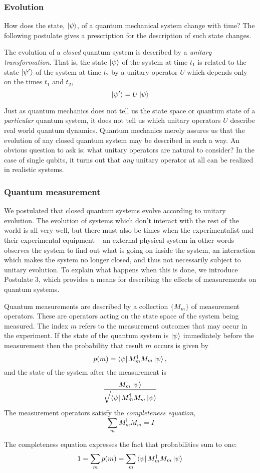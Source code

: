  \subsubsection{Evolution}
 How does the state, $\ket{\psi}$, of a quantum mechanical system change with time? The following postulate gives a prescription for the description of such state changes.
 \begin{postulate}
     The evolution of a \textit{closed} quantum system is described by a \textit{unitary transformation}. That is, the state $\ket{\psi}$ of the system at time $t_1$ is related to the state $\ket{\psi'}$ of the system at time $t_2$ by a unitary operator $U$ which depends only on the times $t_1$ and $t_2$,
        $$\ket{\psi'} = U\ket{\psi}$$
 \end{postulate}
 Just as quantum mechanics does not tell us the state space or quantum state of a \textit{particular} quantum system, it does not tell us which unitary operators $U$ describe real world quantum dynamics. Quantum mechanics merely assures us that the evolution of any closed quantum system may be described in such a way. An obvious question to ask is: what unitary operators are natural to consider? In the case of single qubits, it turns out that \textit{any} unitary operator at all can be realized in realistic systems.
 
 \subsubsection{Quantum measurement}
 We postulated that closed quantum systems evolve according to unitary evolution. The evolution of systems which don’t interact with the rest of the world is all very well, but there must also be times when the experimentalist and their experimental equipment – an external physical system in other words – observes the system to find out what is going on inside the system, an interaction which makes the system no longer closed, and thus not necessarily subject to unitary evolution. To explain what happens when this is done, we introduce Postulate 3, which provides a means for describing the effects of measurements on quantum systems.
\begin{postulate}
    Quantum measurements are described by a collection $\{M_m\}$ of measurement operators. These are operators acting on the state space of the system being measured. The index $m$ refers to the measurement outcomes that may occur in the experiment. If the state of the quantum system is $\ket{\psi}$ immediately before the measurement then the probability that result $m$ occurs is given by
        $$p(m) = \bra{\psi}M_m^\dag M_m\ket{\psi} ,$$
    and the state of the system after the measurement is
    $$\frac{M_m\ket{\psi}}{\sqrt{\bra{\psi}M_m^\dag M_m\ket{\psi}}}$$
    The measurement operators satisfy the \textit{completeness equation},
        $$\sum_{m}{M_m^\dag M_m} = I$$
  
    The completeness equation expresses the fact that probabilities sum to one:
        $$1 = \sum_{m}{p(m)} = \sum_{m}{\bra{\psi}M_m^\dag M_m\ket{\psi}}$$
\end{postulate}

